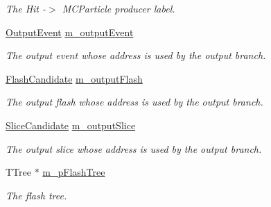 \begin{DoxyCompactItemize}
\begin{DoxyCompactList}\small\item\em The Hit -\/$>$ M\-C\-Particle producer label. \end{DoxyCompactList}\item 
\hypertarget{classflashmatch_1_1FlashMatchingTool_a17f8d293d8a8a47a3a18782c1975cca5}{\hyperlink{classflashmatch_1_1FlashMatchingTool_1_1OutputEvent}{Output\-Event} \hyperlink{classflashmatch_1_1FlashMatchingTool_a17f8d293d8a8a47a3a18782c1975cca5}{m\-\_\-output\-Event}}\label{classflashmatch_1_1FlashMatchingTool_a17f8d293d8a8a47a3a18782c1975cca5}

\begin{DoxyCompactList}\small\item\em The output event whose address is used by the output branch. \end{DoxyCompactList}\item 
\hypertarget{classflashmatch_1_1FlashMatchingTool_a5143114bf5396507981d5beb51cd19ff}{\hyperlink{classflashmatch_1_1FlashMatchingTool_1_1FlashCandidate}{Flash\-Candidate} \hyperlink{classflashmatch_1_1FlashMatchingTool_a5143114bf5396507981d5beb51cd19ff}{m\-\_\-output\-Flash}}\label{classflashmatch_1_1FlashMatchingTool_a5143114bf5396507981d5beb51cd19ff}

\begin{DoxyCompactList}\small\item\em The output flash whose address is used by the output branch. \end{DoxyCompactList}\item 
\hypertarget{classflashmatch_1_1FlashMatchingTool_a1cfed4e60733015c5db55b7683f83fc7}{\hyperlink{classflashmatch_1_1FlashMatchingTool_1_1SliceCandidate}{Slice\-Candidate} \hyperlink{classflashmatch_1_1FlashMatchingTool_a1cfed4e60733015c5db55b7683f83fc7}{m\-\_\-output\-Slice}}\label{classflashmatch_1_1FlashMatchingTool_a1cfed4e60733015c5db55b7683f83fc7}

\begin{DoxyCompactList}\small\item\em The output slice whose address is used by the output branch. \end{DoxyCompactList}\item 
\hypertarget{classflashmatch_1_1FlashMatchingTool_a34a8387456b15a105daac14517040d4d}{T\-Tree $\ast$ \hyperlink{classflashmatch_1_1FlashMatchingTool_a34a8387456b15a105daac14517040d4d}{m\-\_\-p\-Flash\-Tree}}\label{classflashmatch_1_1FlashMatchingTool_a34a8387456b15a105daac14517040d4d}

\begin{DoxyCompactList}\small\item\em The flash tree. \end{DoxyCompactList}\end{DoxyCompactItemize}


